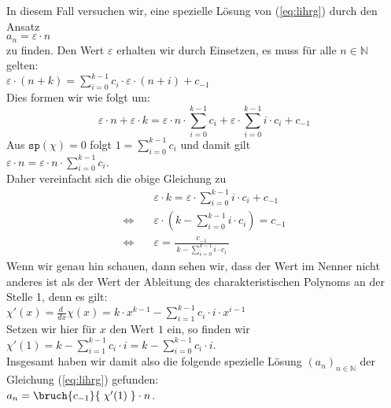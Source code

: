 \begin{enumerate}
      In diesem Fall versuchen wir, eine spezielle L\"{o}sung von (\ref{eq:lihrg}) durch den
      Ansatz \\[0.2cm]
      \hspace*{1.3cm} $a_n = \varepsilon \cdot n $ \\[0.2cm]
      zu finden.  Den Wert $\varepsilon$ erhalten wir durch Einsetzen, es muss f\"{u}r 
      alle $n\in\mathbb{N}$ gelten: \\[0.2cm]
      \hspace*{1.3cm} 
      $\varepsilon \cdot (n + k) = \sum\limits_{i=0}^{k-1} c_{i} \cdot \varepsilon \cdot (n + i) + c_{-1}$  
      \\[0.2cm]
      Dies formen wir wie folgt um:
      \[
        \varepsilon \cdot n + \varepsilon \cdot k = 
        \varepsilon \cdot n \cdot \sum\limits_{i=0}^{k-1} c_{i} +
        \varepsilon \cdot \sum\limits_{i=0}^{k-1} i \cdot c_{i} + c_{-1} 
      \]
      Aus  $\mathtt{sp}(\chi) = 0$ folgt $1  =  \sum\limits_{i=0}^{k-1} c_i$
      und damit gilt \\[0.2cm]
      \hspace*{1.3cm} 
      $\varepsilon \cdot n = \varepsilon \cdot n \cdot \sum\limits_{i=0}^{k-1} c_{i}$.
      \\[0.2cm]
      Daher vereinfacht sich die obige Gleichung zu 
      \[
      \begin{array}{ll}
      & \varepsilon \cdot k = \varepsilon \cdot \sum\limits_{i=0}^{k-1} i \cdot c_{i} + c_{-1} \\[0.4cm]
      \Leftrightarrow\quad 
      & \varepsilon \cdot \left(k - \sum\limits_{i=0}^{k-1} i \cdot c_{i}\right) = c_{-1} 
      \\[0.5cm]
      \Leftrightarrow\quad 
      & \varepsilon = \frac{\displaystyle c_{-1}}{\displaystyle \; k - \sum\limits_{i=0}^{k-1} i \cdot c_{i}\;} 
      \end{array}
      \]
      Wenn wir genau hin schauen, dann sehen wir, dass der Wert im Nenner nicht anderes ist
      als der Wert der Ableitung des charakteristischen Polynoms an der Stelle 1, denn es gilt: \\[0.2cm]
      \hspace*{1.3cm} 
      $\chi'(x) =\frac{d\;}{dx}\chi(x) = k \cdot x^{k-1} - \sum\limits_{i=1}^{k-1} c_{i}\cdot i \cdot x^{i-1}$
      \\[0.2cm]
      Setzen wir hier f\"{u}r $x$ den Wert $1$ ein, so finden wir \\[0.2cm]
      \hspace*{1.3cm} 
      $\chi'(1) = k - \sum\limits_{i=1}^{k-1} c_{i}\cdot i =  k - \sum\limits_{i=0}^{k-1} c_{i}\cdot i$. 
      \\[0.2cm]
      Insgesamt haben wir damit also die folgende spezielle L\"{o}sung $(a_n)_{n\in\mathbb{N}}$
      der Gleichung (\ref{eq:lihrg}) gefunden: \\[0.2cm]
      \hspace*{1.3cm} $a_n = \bruch{c_{-1}}{\;\chi'(1)\;}\cdot n$.


\end{enumerate}
